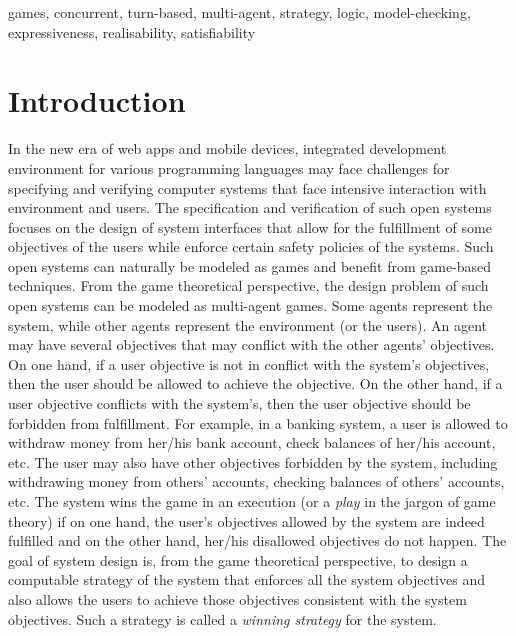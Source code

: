 \documentclass[11pt]{article}
\begin{document}
games, concurrent, turn-based, multi-agent, strategy,  
logic, model-checking, expressiveness, realisability, satisfiability 


\section{Introduction \label{sec.intro}}

In the new era of web apps and mobile devices, integrated development 
environment for various programming languages may face challenges for 
specifying and verifying 
computer systems that face intensive interaction with environment and users.  
The specification and verification of such open systems
focuses on the design of system interfaces that allow 
for the fulfillment of some objectives of the users while 
enforce certain safety policies of the systems.
Such open systems can naturally be modeled as games and 
benefit from game-based techniques.  \label{reply1.toplas.scope} 
From the game theoretical perspective, the design problem 
of such open systems can be modeled as multi-agent games.  
Some agents represent the system, while 
other agents represent the environment (or the users).  
An agent may have several objectives that may conflict with the other agents' objectives. 
On one hand, if a user objective is not in conflict with the system's objectives, then 
the user should be allowed to achieve the objective. 
On the other hand, if a user objective conflicts with the system's, 
then the user objective should be forbidden from fulfillment.  
For example, in a banking system, a user is allowed to withdraw money from her/his bank account, check balances of her/his account, etc. 
The user may also have other objectives forbidden by the system, 
including withdrawing money from others' accounts, 
checking balances of others' accounts, etc.  
The system wins the game in an execution 
(or a {\em play} in the jargon of game theory) 
if on one hand, the user's objectives allowed by the system are indeed fulfilled 
and on the other hand, her/his disallowed objectives do not happen.  
The goal of system design is, from the game theoretical perspective, 
to design a computable strategy of the system that 
enforces all the system objectives and also allows the users to 
achieve those objectives consistent with the system objectives.  
Such a strategy is called a {\em winning strategy} for the system.  
\end{document}
